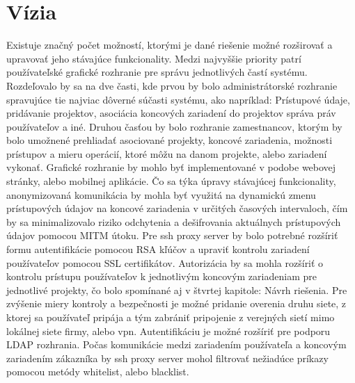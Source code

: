 \section{Vízia}\label{sec:vizia}

Existuje značný počet možností, ktorými je dané riešenie možné rozširovať a upravovať jeho stávajúce funkcionality.
Medzi najvyššie priority patrí používateľské grafické rozhranie pre správu jednotlivých častí systému.
Rozdeľovalo by sa na dve časti, kde prvou by bolo administrátorské rozhranie spravujúce tie najviac dôverné súčasti systému,
ako napríklad: Prístupové údaje, pridávanie projektov, asociácia koncových zariadení do projektov správa práv používateľov a iné.
Druhou časťou by bolo rozhranie zamestnancov, ktorým by bolo umožnené prehliadať asociované projekty, koncové zariadenia, možnosti
prístupov a mieru operácií, ktoré môžu na danom projekte, alebo zariadení vykonať.
Grafické rozhranie by mohlo byť implementované v podobe webovej stránky, alebo mobilnej aplikácie.
Čo sa týka úpravy stávajúcej funkcionality, anonymizovaná komunikácia by mohla byť využitá na dynamickú zmenu prístupových údajov
na koncové zariadenia v určitých časových intervaloch, čím by sa minimalizovalo riziko odchytenia a dešifrovania aktuálnych
prístupových údajov pomocou MITM útoku.
Pre ssh proxy server by bolo potrebné rozšíriť formu autentifikácie pomocou RSA kľúčov a upraviť kontrolu zariadení používateľov
pomocou SSL certifikátov.
Autorizácia by sa mohla rozšíriť o kontrolu prístupu používateľov k jednotlivým koncovým zariadeniam pre jednotlivé projekty,
čo bolo spomínané aj v štvrtej kapitole: Návrh riešenia.
Pre zvýšenie miery kontroly a bezpečnosti je možné pridanie overenia druhu siete, z ktorej sa používateľ pripája a tým zabrániť
pripojenie z verejných sietí mimo lokálnej siete firmy, alebo vpn.
Autentifikáciu je možné rozšíriť pre podporu LDAP rozhrania.
Počas komunikácie medzi zariadením používateľa a koncovým zariadením zákazníka by ssh proxy server mohol filtrovať nežiadúce príkazy
pomocou metódy whitelist, alebo blacklist.
